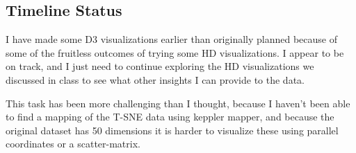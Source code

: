 \documentclass{article}
\begin{document}
\subsection{Timeline Status}

I have made some D3 visualizations earlier than originally planned because of some of the fruitless outcomes of trying some HD visualizations. I appear to be on track, and I just need to continue exploring the HD visualizations we discussed in class to see what other insights I can provide to the data. 

This task has been more challenging than I thought, because I haven't been able to find a mapping of the T-SNE data using keppler mapper, and because the original dataset has 50 dimensions it is harder to visualize these using parallel coordinates or a scatter-matrix. 
\end{document}
